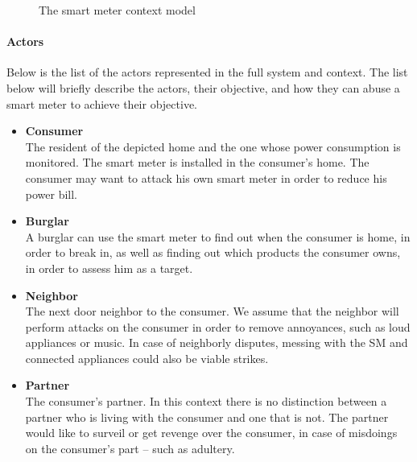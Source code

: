 \begin{figure}[h]
  \centering
  
  \caption{The smart meter context model}
  \label{contextual:sm_model}
\end{figure}

\paragraph{Actors}\label{contextActors}
Below is the list of the actors represented in the full system and context.
The list below will briefly describe the actors, their objective, and how they can abuse a smart meter to achieve their objective.
\begin{itemize}
\item \textbf{Consumer}\\
The resident of the depicted home and the one whose power consumption is monitored.
The smart meter is installed in the consumer's home.
The consumer may want to attack his own smart meter in order to reduce his power bill.
\item \textbf{Burglar}\\ A burglar can use the smart meter to find out when the consumer is home, in order to break in, as well as finding out which products the consumer owns, in order to assess him as a target.
\item \textbf{Neighbor}\\
The next door neighbor to the consumer.
We assume that the neighbor will perform attacks on the consumer in order to remove annoyances, such as loud appliances or music.
In case of neighborly disputes, messing with the SM and connected appliances could also be viable strikes.
\item \textbf{Partner}\\
The consumer's partner.
In this context there is no distinction between a partner who is living with the consumer and one that is not.
The partner would like to surveil or get revenge over the consumer, in case of misdoings on the consumer's part -- such as adultery.


\end{itemize}
